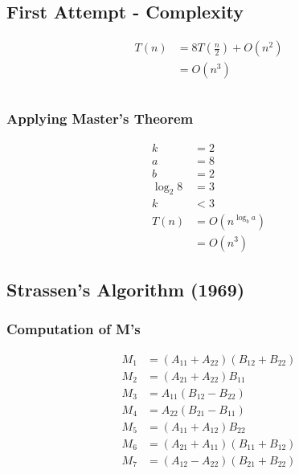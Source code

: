 \documentclass{article}
\theoremstyle{definition}
\theoremstyle{remark}
\theoremstyle{plain}
\begin{document}
\subsection{First Attempt - Complexity}

\begin{equation*}
\begin{split}
T(n) & = 8 T(\frac{n}{2}) + O(n^2)\\
&= O(n^3)\\\\
\end{split}
\end{equation*}

\subsubsection{Applying Master's Theorem}
\begin{equation*}
\begin{split}
k &= 2\\
a & = 8\\
b &= 2\\
\log_2 8 & = 3\\
k & < 3\\
T(n) & = O(n^{\log_b a})\\
& = O(n^3)
\end{split}
\end{equation*}

\subsection{Strassen's Algorithm (1969)}
\subsubsection{Computation of M's}
\begin{equation*}
	\begin{split}
		M_1 &= (A_{11} + A_{22}) (B_{12} + B_{22})\\
		M_2 &= (A_{21}+ A_{22}) B_{11}\\
		M_3 &= A_{11} (B_{12} - B_{22})\\
		M_4 &= A_{22} (B_{21} - B_{11})\\
		M_5 &= (A_{11} + A_{12}) B_{22}\\
		M_6 &= (A_{21} + A_{11}) (B_{11} + B_{12})\\
		M_7 &= (A_{12} - A_{22})(B_{21} + B_{22})
	\end{split}
\end{equation*}
\end{document}
